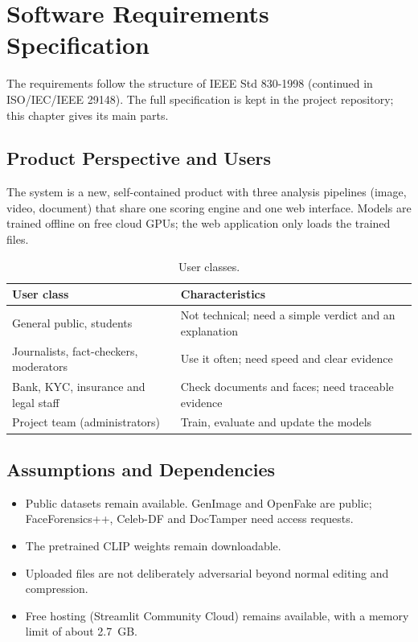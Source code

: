 \chapter{Software Requirements Specification}
The requirements follow the structure of IEEE Std 830-1998 (continued in ISO/IEC/IEEE 29148). The full specification is kept in the project repository; this chapter gives its main parts.

\section{Product Perspective and Users}
The system is a new, self-contained product with three analysis pipelines (image, video, document) that share one scoring engine and one web interface. Models are trained offline on free cloud GPUs; the web application only loads the trained files.

\begin{table}[htbp]
\centering\small
\caption{User classes.}
\begin{tabularx}{\linewidth}{@{}p{4.2cm}X@{}}
\toprule
User class & Characteristics\\
\midrule
General public, students & Not technical; need a simple verdict and an explanation\\
Journalists, fact-checkers, moderators & Use it often; need speed and clear evidence\\
Bank, KYC, insurance and legal staff & Check documents and faces; need traceable evidence\\
Project team (administrators) & Train, evaluate and update the models\\
\bottomrule
\end{tabularx}
\end{table}

\section{Assumptions and Dependencies}
\begin{itemize}
  \item Public datasets remain available. GenImage and OpenFake are public; FaceForensics++, Celeb-DF and DocTamper need access requests.
  \item The pretrained CLIP weights remain downloadable.
  \item Uploaded files are not deliberately adversarial beyond normal editing and compression.
  \item Free hosting (Streamlit Community Cloud) remains available, with a memory limit of about 2.7~GB.
\end{itemize}

